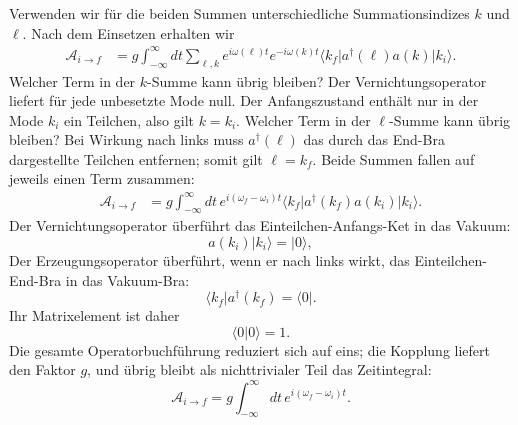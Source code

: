 Verwenden wir für die beiden Summen unterschiedliche Summationsindizes \(k\) und \(\ell\). Nach dem Einsetzen erhalten wir
\begin{align}
\mathcal A_{i\to f}
&=g\int_{-\infty}^{\infty}dt
\sum_{\ell,k}
e^{i\omega(\ell)t}e^{-i\omega(k)t}
\langle k_f\rvert a^\dagger(\ell)a(k)\lvert k_i\rangle.
\end{align}
Welcher Term in der \(k\)-Summe kann übrig bleiben? Der Vernichtungsoperator liefert für jede unbesetzte Mode null. Der Anfangszustand enthält nur in der Mode \(k_i\) ein Teilchen, also gilt \(k=k_i\). Welcher Term in der \(\ell\)-Summe kann übrig bleiben? Bei Wirkung nach links muss \(a^\dagger(\ell)\) das durch das End-Bra dargestellte Teilchen entfernen; somit gilt \(\ell=k_f\). Beide Summen fallen auf jeweils einen Term zusammen:
\begin{align}
\mathcal A_{i\to f}
&=g\int_{-\infty}^{\infty}dt\,
e^{i(\omega_f-\omega_i)t}
\langle k_f\rvert a^\dagger(k_f)a(k_i)\lvert k_i\rangle.
\end{align}
Der Vernichtungsoperator überführt das Einteilchen-Anfangs-Ket in das Vakuum:
\begin{equation}
a(k_i)\lvert k_i\rangle=\lvert0\rangle,
\end{equation}
Der Erzeugungsoperator überführt, wenn er nach links wirkt, das Einteilchen-End-Bra in das Vakuum-Bra:
\begin{equation}
\langle k_f\rvert a^\dagger(k_f)=\langle0\rvert.
\end{equation}
Ihr Matrixelement ist daher
\begin{equation}
\langle0\vert0\rangle=1.
\end{equation}
Die gesamte Operatorbuchführung reduziert sich auf eins; die Kopplung liefert den Faktor \(g\), und übrig bleibt als nichttrivialer Teil das Zeitintegral:
\begin{equation}
\mathcal A_{i\to f}
=g\int_{-\infty}^{\infty}dt\,
e^{i(\omega_f-\omega_i)t}.
\end{equation}


